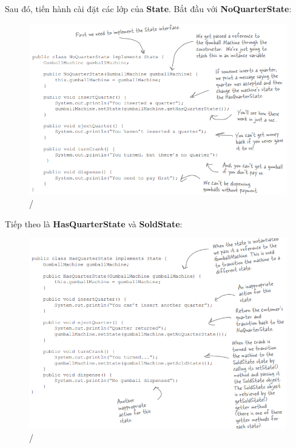 Sau đó, tiến hành cài đặt các lớp của \textbf{State}. Bắt đầu với \textbf{NoQuarterState}:
\begin{figure}[!htb]
    \centering
    \includegraphics[width=\textwidth]{fig/State/NoQuarterState.png}/
\end{figure}\smallskip

Tiếp theo là \textbf{HasQuarterState} và \textbf{SoldState}:

\begin{figure}[!htb]
    \centering
    \includegraphics[width=\textwidth]{fig/State/HasQuarterState.png}/
\end{figure}\bigskip

